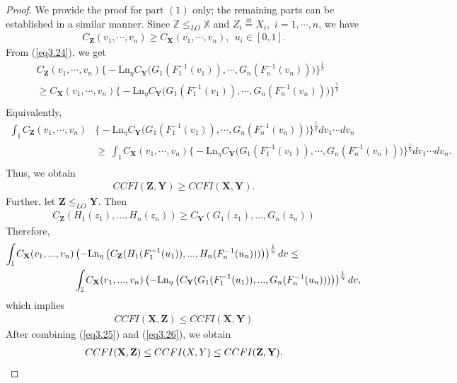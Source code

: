 \documentclass[10pt,a4paper]{amsart}
\begin{document}
\begin{proof}
We provide the proof for part $(1)$ only; the remaining parts can be established in a similar manner.
 Since $\mathbb{Z}\le_{LO}\mathbb{X}$ and $Z_i\overset{\mathrm{st}}{=}X_i$,~$i=1,\cdots,n$, we have 
\begin{align}\label{eq3.24}
C_\textbf{Z}(v_1,\cdots,v_n)\ge C_\textbf{X}(v_1,\cdots,v_n),~~u_i\in[0,1].
\end{align}
 From (\ref{eq3.24}), we get
\begin{align*}
& C_\textbf{Z}(v_1,\cdots,v_n)\Big\{-\mathrm{Ln}_\eta C_\textbf{Y}\big(G_1(F^{-1}_1(v_1)),\cdots, G_n(F^{-1}_n(v_n))\big)\Big\}^{\frac{1}{\eta}}\nonumber\\
&\ge C_\textbf{X}(v_1,\cdots,v_n)\Big\{-\mathrm{Ln}_\eta C_\textbf{Y}\big(G_1(F^{-1}_1(v_1)),\cdots, G_n(F^{-1}_n(v_n))\big)\Big\}^{\frac{1}{\eta}}\nonumber\\
\end{align*}
Equivalently,
\begin{align*}
	\int_{\mathbb I}C_\textbf{Z}(v_1,\cdots,v_n)&\Big\{-\mathrm{Ln}_\eta C_\textbf{Y}\big(G_1(F^{-1}_1(v_1)),\cdots, G_n(F^{-1}_n(v_n))\big)\Big\}^{\frac{1}{\eta}}dv_1\cdots dv_n\nonumber\\
	&\ge \ \int_{\mathbb I}C_\textbf{X}(v_1,\cdots,v_n)\Big\{-\mathrm{Ln}_\eta C_\textbf{Y}\big(G_1(F^{-1}_1(v_1)),\cdots, G_n(F^{-1}_n(v_n))\big)\Big\}^{\frac{1}{\eta}}dv_1\cdots dv_n.\nonumber\\
\end{align*}
Thus, we obtain
\begin{align}\label{eq3.25}
	CCFI(\textbf{Z},\textbf{Y})\ge CCFI(\textbf{X},\textbf{Y}).
\end{align}
Further, let $\mathbf Z\leq_{LO}\mathbf Y$. Then
\begin{align*}
	C_{\mathbf Z}(H_1(z_1),...,H_n(z_n))\geq C_{\mathbf Y}(G_1(z_1),...,G_n(z_n))
\end{align*}
Therefore, 
\begin{align*}
	\int_{\mathbb I}C_{\mathbf X}(v_1,...,v_n)&\left(-\mathrm{Ln}_\eta\left(C_{\mathbf Z}(H_1(F_1^{-1}(u_1)),...,H_n(F_n^{-1}(u_n)))\right)\right)^{\frac{1}{\eta}}d\textbf v\leq \\	&\int_{\mathbb I}C_{\mathbf X}(v_1,...,v_n)\left(-\mathrm{Ln}_\eta\left(C_{\mathbf Y}(G_1(F_1^{-1}(u_1)),...,G_n(F_n^{-1}(u_n)))\right)\right)^{\frac{1}{\eta}}d\textbf v,
\end{align*}
which implies 
\begin{align}\label{eq3.26}
	CCFI(\mathbf X,\mathbf Z)\leq CCFI(\mathbf X,\mathbf Y)
\end{align}
After combining (\ref{eq3.25}) and (\ref{eq3.26}), we obtain
\begin{align*}
CCFI(\mathbf X,\mathbf Z)\leq CCFI(\textbf X,\textbf Y)\le CCFI(\mathbf Z,\mathbf Y).
\end{align*}
\end{proof}
\end{document}
